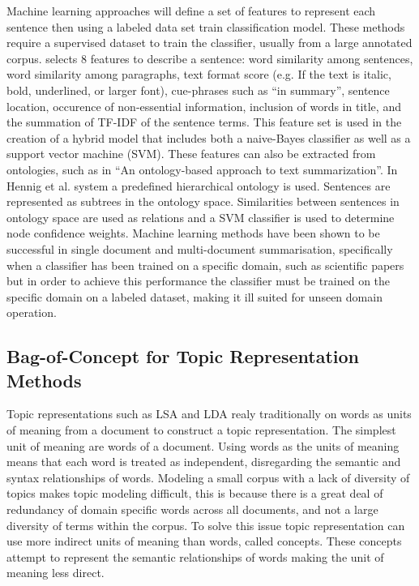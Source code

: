 Machine learning approaches will define a set of features to represent each sentence then using a labeled data set train classification model. These methods require a supervised dataset to train the classifier, usually from a large annotated corpus. \citet{fattah2014hybrid} selects 8 features to describe a sentence: word similarity among sentences, word similarity among paragraphs, text format score (e.g. If the text is italic, bold, underlined, or larger font), cue-phrases such as “in summary”, sentence location, occurence of non-essential information, inclusion of words in title, and the summation of TF-IDF of the sentence terms. This feature set is used in the creation of a hybrid model that includes both a naive-Bayes classifier as well as a support vector machine (SVM). These features can also be extracted from ontologies, such as in \citet{hennig2008ontology} “An ontology-based approach to text summarization”. In Hennig et al. system a predefined hierarchical ontology is used. Sentences are represented as subtrees in the ontology space. Similarities between sentences in ontology space are used as relations and a SVM classifier is used to determine node confidence weights. Machine learning methods have been shown to be successful in single document and multi-document summarisation, specifically when a classifier has been trained on a specific domain, such as scientific papers \citep{qazvinian2008scientific,qazvinian2013generating} but in order to achieve this performance the classifier must be trained on the specific domain on a labeled dataset, making it ill suited for unseen domain operation.

\subsection*{Bag-of-Concept for Topic Representation Methods}
\label{subsec:2.3.3}
Topic representations such as LSA and LDA realy traditionally on words as units of meaning from a document to construct a topic representation. The simplest unit of meaning are words of a document. Using words as the units of meaning means that each word is treated as independent, disregarding the semantic and syntax relationships of words. Modeling a small corpus with a lack of diversity of topics makes topic modeling difficult, this is because there is a great deal of redundancy of domain specific words across all documents, and not a large diversity of terms within the corpus. To solve this issue topic representation can use more indirect units of meaning than words, called concepts. These concepts attempt to represent the semantic relationships of words making the unit of meaning less direct.

